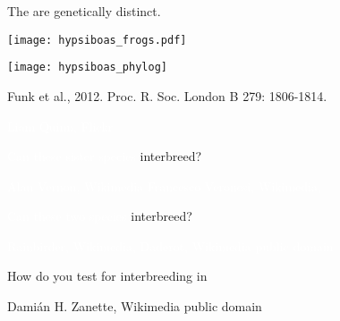 \documentclass[t]{beamer}
\begin{document}
\begin{frame}{The  are genetically distinct.}

	\vspace*{-0.5\baselineskip}
	
	\centering
	\begin{multicols}{2}
	
		\texttt{[image: hypsiboas\_frogs.pdf]} \vfill
	
	\columnbreak
	
		\texttt{[image: hypsiboas\_phylog]} \vfill
	
	\end{multicols}

	\vfilll

	\hfill \tiny Funk et al., 2012. Proc. R. Soc. London B 279: 1806-1814.

\end{frame}
%
{
\begin{frame}[b]

	\hfill \tiny \textcolor{white}{Liam Quinn, Flickr }

\end{frame}
}
%
{
\begin{frame}[b]{\textcolor{white}{Can these sister species} \textcolor{orange5}{interbreed?}}

	\tiny\textcolor{white}{Alan Vernon, Wikimedia  \hfill Francesco Veronesi, Wikimedia, }
\end{frame}
}
%
{
\begin{frame}[b]{\textcolor{white}{Can these two species} \textcolor{orange5}{interbreed?}}

	\tiny\textcolor{white}{Rainbirder, Wikimedia,  \hfill Daderot, Wikimedia public domain}
\end{frame}
}
%
{
\begin{frame}[b]{How do you test for interbreeding in }

	\tiny Damián H. Zanette, Wikimedia public domain

\end{frame}
}
\end{document}
